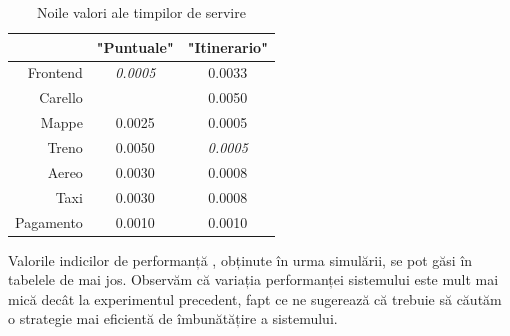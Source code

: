 \documentclass[12pt]{article}
\begin{document}
            \begin{table}[!h]
                \centering
                \begin{tabular}{r|cc}
                    \multicolumn{1}{c|}{} & "Puntuale"      & "Itinerario"    \\ \hline
                    Frontend              & \textit{0.0005} & 0.0033 \\
                    Carello               &                 & 0.0050          \\
                    Mappe                 & 0.0025          & 0.0005          \\
                    Treno                 & 0.0050          & \textit{0.0005} \\
                    Aereo                 & 0.0030          & 0.0008          \\
                    Taxi                  & 0.0030          & 0.0008          \\
                    Pagamento             & 0.0010          & 0.0010         
                \end{tabular}
                \caption{Noile valori ale timpilor de servire}
            \end{table}

            Valorile indicilor de performanță , obținute în urma simulării, se pot găsi în tabelele de mai jos. Observăm că variația performanței sistemului este mult mai mică decât la experimentul precedent, fapt ce ne sugerează că trebuie să căutăm o strategie mai eficientă de îmbunătățire a sistemului.
\end{document}
